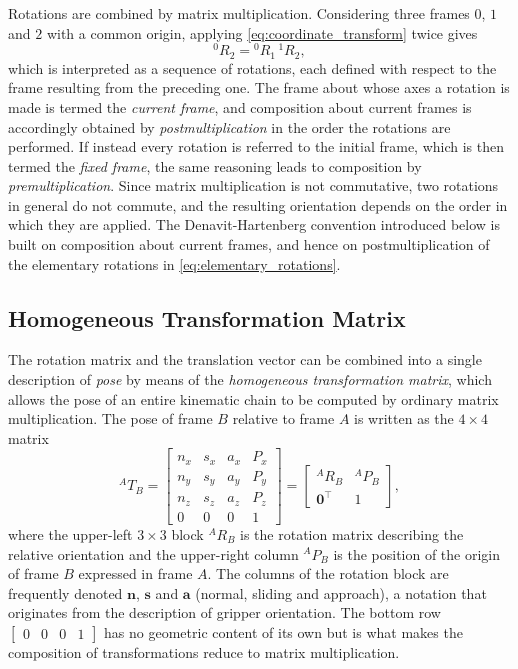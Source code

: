 Rotations are combined by matrix multiplication. Considering three frames $0$, $1$
and $2$ with a common origin, applying \eqref{eq:coordinate_transform} twice gives
\begin{equation}
    ^0 R_2 = {}^0 R_1 \, ^1 R_2,
    \label{eq:rotation_composition}
\end{equation}
which is interpreted as a sequence of rotations, each defined with respect to the
frame resulting from the preceding one. The frame about whose axes a rotation is
made is termed the \textit{current frame}, and composition about current frames is
accordingly obtained by \textit{postmultiplication} in the order the rotations are
performed. If instead every rotation is referred to the initial frame, which is
then termed the \textit{fixed frame}, the same reasoning leads to composition by
\textit{premultiplication}. Since matrix multiplication is not commutative, two
rotations in general do not commute, and the resulting orientation depends on the
order in which they are applied. The Denavit-Hartenberg convention introduced
below is built on composition about current frames, and hence on postmultiplication
of the elementary rotations in \eqref{eq:elementary_rotations}.

\subsection{Homogeneous Transformation Matrix}

The rotation matrix and the translation vector can be combined into a single
description of \textit{pose} by means of the \textit{homogeneous transformation
matrix}, which allows the pose of an entire kinematic chain to be computed by
ordinary matrix multiplication. The pose of frame $B$
relative to frame $A$ is written as the $4 \times 4$ matrix
\begin{equation}
^A T_B = \begin{bmatrix}
n_x & s_x & a_x & P_x \\
n_y & s_y & a_y & P_y \\
n_z & s_z & a_z & P_z \\
0 & 0 & 0 & 1
\end{bmatrix} = \begin{bmatrix}
^A R_B & ^A P_B \\
\mathbf{0}^\top & 1
\end{bmatrix},
\end{equation}
where the upper-left $3 \times 3$ block $^A R_B$ is the rotation matrix describing
the relative orientation and the upper-right column $^A P_B$ is the position of the
origin of frame $B$ expressed in frame $A$. The columns of the rotation block are
frequently denoted $\mathbf{n}$, $\mathbf{s}$ and $\mathbf{a}$ (normal, sliding and
approach), a notation that originates from the description of gripper orientation.
The bottom row $\begin{bmatrix} 0 & 0 & 0 & 1 \end{bmatrix}$ has no geometric content
of its own but is what makes the composition of transformations reduce to matrix
multiplication.

